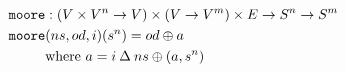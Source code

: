\documentclass[preview]{standalone}
\begin{document}
\begin{align*}
  \texttt{moore} &: (V \times V^n \rightarrow V) \times (V \rightarrow V^m) \times E
                   \rightarrow S^n \rightarrow S^m \\
  \texttt{moore} &(ns,od,i)(s^n) = od \oplus a \\
                 &\text{where}\ a = i \mathbin{\Delta} ns \oplus (a, s^n)
\end{align*}
\end{document}
